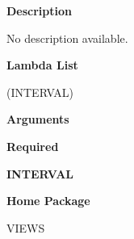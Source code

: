  
{\bf Description}

No description available.

 
{\bf Lambda List}

(INTERVAL)

 
{\bf Arguments}


\beginhang
{\bf Required}\hspace{2em}
 
{\bf INTERVAL}


 
\endhang
 
{\bf Home Package}

VIEWS

